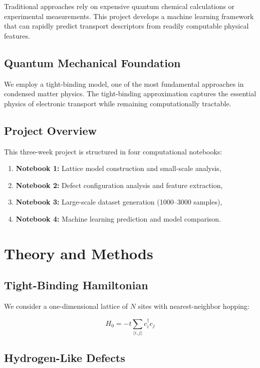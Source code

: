 \documentclass[11pt,a4paper]{article}
\begin{document}
Traditional approaches rely on expensive quantum chemical calculations or experimental measurements. This project develops a machine learning framework that can rapidly predict transport descriptors from readily computable physical features.

\subsection{Quantum Mechanical Foundation}

We employ a tight-binding model, one of the most fundamental approaches in condensed matter physics. The tight-binding approximation captures the essential physics of electronic transport while remaining computationally tractable.

\subsection{Project Overview}

This three-week project is structured in four computational notebooks:

\begin{enumerate}
    \item \textbf{Notebook 1:} Lattice model construction and small-scale analysis,
    \item \textbf{Notebook 2:} Defect configuration analysis and feature extraction,
    \item \textbf{Notebook 3:} Large-scale dataset generation (1000--3000 samples),
    \item \textbf{Notebook 4:} Machine learning prediction and model comparison.
\end{enumerate}

\newpage
\section{Theory and Methods}

\subsection{Tight-Binding Hamiltonian}

We consider a one-dimensional lattice of $N$ sites with nearest-neighbor hopping:

\begin{equation}
H_0 = -t \sum_{\langle i,j \rangle} c_i^\dagger c_j
\end{equation}

\subsection{Hydrogen-Like Defects}
\end{document}
